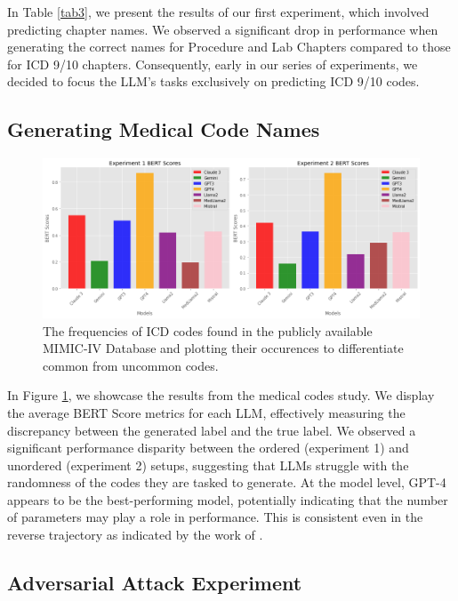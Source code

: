 \documentclass[11pt]{article}
\theoremstyle{plain}
\theoremstyle{definition}
\theoremstyle{remark}
\begin{document}
In Table \ref{tab3}, we present the results of our first experiment, which involved predicting chapter names. We observed a significant drop in performance when generating the correct names for Procedure and Lab Chapters compared to those for ICD 9/10 chapters. Consequently, early in our series of experiments, we decided to focus the LLM's tasks exclusively on predicting ICD 9/10 codes.



\subsection{Generating Medical Code Names}

 \begin{figure}[h!]
   \centering 
   \includegraphics[width=\columnwidth]{bert-score.png} 
   \caption{The frequencies of ICD codes found in the publicly available MIMIC-IV Database and plotting their occurences to differentiate common from uncommon codes.}
   \label{bert} 
 \end{figure} 

In Figure \ref{bert}, we showcase the results from the medical codes study. We display the average BERT Score metrics for each LLM, effectively measuring the discrepancy between the generated label and the true label. We observed a significant performance disparity between the ordered (experiment 1) and unordered (experiment 2) setups, suggesting that LLMs struggle with the randomness of the codes they are tasked to generate. At the model level, GPT-4 appears to be the best-performing model, potentially indicating that the number of parameters may play a role in performance. This is consistent even in the reverse trajectory as indicated by the work of \cite{soroush2024large}.


\subsection{Adversarial Attack Experiment}
\end{document}
